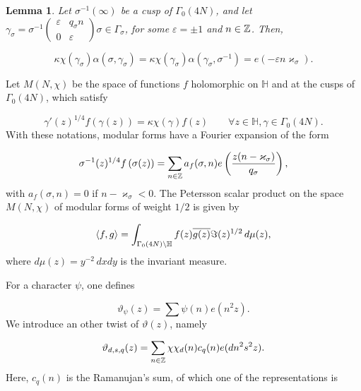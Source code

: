 \documentclass[leqno,10pt]{amsart}
\theoremstyle{plain}
\numberwithin{equation}{section}
\newtheorem{lemme}[thm]{Lemma}
\theoremstyle{definition}
\theoremstyle{remark}
\begin{document}
\begin{lemme}\label{mod:lemme:1}
Let $\sigma^{-1}(\infty)$ be a cusp of $\Gamma_0(4N)$, and let $\gamma_\sigma=\sigma^{-1} \left(\begin{smallmatrix} \varepsilon & q_\sigma n \\ 0&\varepsilon \end{smallmatrix}\right)\sigma\in\Gamma_\sigma$, for some $\varepsilon=\pm 1$ and $n\in \mathbb{Z}$. Then,

\begin{equation*}
\kappa\chi(\gamma_\sigma) \alpha(\sigma,\gamma_\sigma) = \kappa\chi(\gamma_\sigma) \alpha(\gamma_\sigma,\sigma^{-1})= e(-\varepsilon n \varkappa_\sigma).
\end{equation*}
\end{lemme}
Let $M(N,\chi)$ be the space of functions $f$ holomorphic on $\mathbb{H}$ and at the cusps of $\Gamma_0(4N)$, which satisfy

\begin{equation*}
\gamma'(z)^{1/4} f\left(\gamma(z)\right) =\kappa \chi (\gamma) f(z) \qquad \forall z\in \mathbb{H}, \gamma \in \Gamma_0(4N).
\end{equation*}
With these notations, modular forms have a Fourier expansion of the form

\begin{equation*}
\sigma^{-1}(z)^{1/4} f\left(\sigma(z)\right) = \sum_{n\in \mathbb{Z}} a_f(\sigma,n) e\left(\frac{z(n-\varkappa_\sigma)}{q_\sigma}\right),
\end{equation*}
with $a_f(\sigma,n)=0$ if $n-\varkappa_\sigma<0$. 
The Petersson scalar product on the space $M(N,\chi)$ of modular forms of weight $1/2$ is given by

\begin{equation*}
\langle f,g\rangle = \int_{\Gamma_0(4N)\backslash \mathbb{H}} f(z) \overline{g(z)} \Im(z)^{1/2}\, d\mu(z),
\end{equation*}
where $d\mu (z) =y^{-2}\, dx dy$ is the invariant measure. 

For a character $\psi$, one defines

\begin{equation*}
\vartheta_\psi(z)=\sum \psi(n)e(n^2z).
\end{equation*}
We introduce an other twist of $\vartheta(z)$, namely

\begin{equation}\label{mod:eq:3}
\vartheta_{d,s,q}(z) = \sum_{n\in \mathbb{Z}} \chi\chi_d(n) c_q(n) e(dn^2s^2 z).
\end{equation}
Here, $c_q(n)$ is the Ramanujan's sum, of which one of the representations is 
\end{document}
